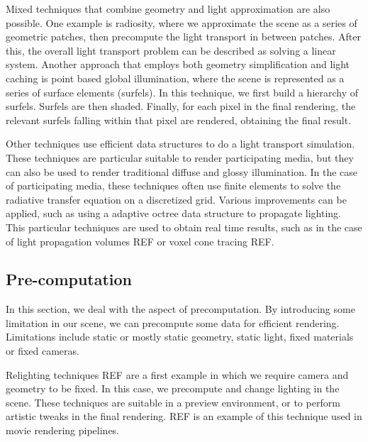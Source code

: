 Mixed techniques that combine geometry and light approximation are also possible. One example is radiosity, where we approximate the scene as a series of geometric patches, then precompute the light transport in between patches. After this, the overall light transport problem can be described as solving a linear system. Another approach that employs both geometry simplification and light caching is point based global illumination, where the scene is represented as a series of surface elements (surfels). In this technique, we first build a hierarchy of surfels. Surfels are then shaded. Finally, for each pixel in the final rendering, the relevant surfels falling within that pixel are rendered, obtaining the final result. 

Other techniques use efficient data structures to do a light transport simulation. These techniques are particular suitable to render participating media, but they can also be used to render traditional diffuse and glossy illumination. In the case of participating media, these techniques often use finite elements to solve the radiative transfer equation on a discretized grid. Various improvements can be applied, such as using a adaptive octree data structure to propagate lighting. This particular techniques are used to obtain real time results, such as in the case of light propagation volumes REF or voxel cone tracing REF. 

\subsection{Pre-computation}
In this section, we deal with the aspect of precomputation. By introducing some limitation in our scene, we can precompute some data for efficient rendering. Limitations include static or mostly static geometry, static light, fixed materials or fixed cameras. 

Relighting techniques REF are a first example in which we require camera and geometry to be fixed. In this case, we precompute and change lighting in the scene. These techniques are suitable in a preview environment, or to perform artistic tweaks in the final rendering. REF is an example of this technique used in movie rendering pipelines. 

